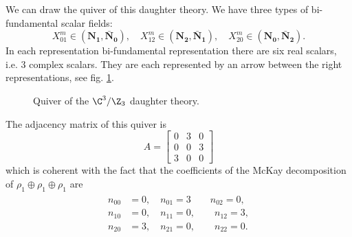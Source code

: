 \documentclass{worksheetclass}
\begin{document}
            We can draw the quiver of this daughter theory. We have three types of bi-fundamental scalar fields:
            \begin{equation}
                X^m_{01}\in(\boldsymbol{\textbf{N}_{1}},\boldsymbol{\bar{\textbf{N}}_0}),\quad
                X^m_{12}\in(\boldsymbol{\textbf{N}_{2}},\boldsymbol{\bar{\textbf{N}}_1}),\quad
                X^m_{20}\in(\boldsymbol{\textbf{N}_{0}},\boldsymbol{\bar{\textbf{N}}_2}).
            \end{equation}
            In each representation bi-fundamental representation there are six real scalars, i.e. 3 complex scalars. They are each represented by an arrow between the right representations, see fig. \ref{fig:Z3quiver}.
            \begin{figure}[H]
                \centering
                \caption{Quiver of the $\C^3/\Z_3$ daughter theory.}
                \label{fig:Z3quiver}
            \end{figure}
            The adjacency matrix of this quiver is
            \begin{equation}
                A=
                \begin{bmatrix}
                    0 & 3 & 0 \\
                    0 & 0 & 3 \\
                    3 & 0 & 0
                \end{bmatrix}
            \end{equation}
            which is coherent with the fact that the coefficients of the McKay decomposition of $\rho_1\oplus\rho_1\oplus\rho_1$ are
            \begin{align}
                \begin{split}
                    n_{00} &= 0,\quad n_{01} = 3\qquad n_{02}=0,\\
                    n_{10} &= 0,\quad n_{11} = 0,\qquad n_{12}=3,\\
                    n_{20} &= 3,\quad n_{21} = 0,\qquad n_{22}=0.
                \end{split}
            \end{align}
\end{document}
